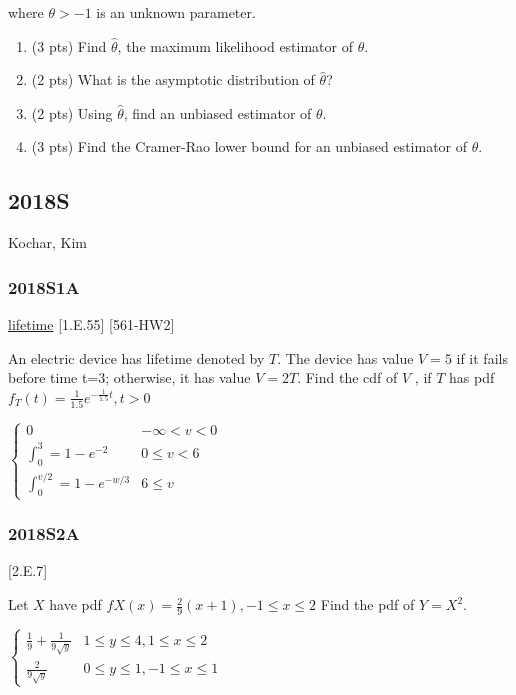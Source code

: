 \documentclass[10pt,twocolumn,portrait]{article}
\begin{document}
where \(\theta>-1\) is an unknown parameter.

\begin{enumerate}
\def\labelenumi{(\alph{enumi})}
\item
  (3 pts) Find \(\hat\theta\), the maximum likelihood estimator of
  \(\theta\).
\item
  (2 pts) What is the asymptotic distribution of \(\hat\theta\)?
\item
  (2 pts) Using \(\hat\theta\), find an unbiased estimator of
  \(\theta\).
\item
  (3 pts) Find the Cramer-Rao lower bound for an unbiased estimator of
  \(\theta\).
\end{enumerate}

\hypertarget{s-10}{%
\subsection{2018S}\label{s-10}}

Kochar, Kim

\hypertarget{s1a-1}{%
\subsubsection{2018S1A}\label{s1a-1}}

\protect\hyperlink{lifetime}{lifetime}
{[}1.E.55{]}\protect\hyperlink{section}{} {[}561-HW2{]}

An electric device has lifetime denoted by \(T\). The device has value
\(V=5\) if it fails before time t=3; otherwise, it has value \(V=2T\).
Find the cdf of \(V\) , if \(T\) has pdf
\(f_T(t)=\frac1{1.5}e^{-\frac1{1.5}t}, t>0\)

\(\begin{cases} 0& -\infty<v<0 \\\int_0^3=1-e^{-2} & 0\le v<6 \\ \int_0^{v/2}=1-e^{-w/3} &6\le v\end{cases}\)

\hypertarget{s2a-2}{%
\subsubsection{2018S2A}\label{s2a-2}}

{[}2.E.7{]}\protect\hyperlink{section}{}

Let \(X\) have pdf \(fX(x)=\frac29(x+1), -1\le x\le2\) Find the pdf of
\(Y=X^2\).

\(\begin{cases}\frac{1}{9}+\frac{1}{9\sqrt y}&1\le y\le4,1\le x\le2\\\frac{2}{9\sqrt y}& 0\le y\le1,-1\le x\le1\end{cases}\)
\end{document}
